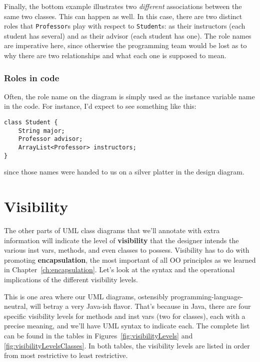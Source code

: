 Finally, the bottom example illustrates two \textit{different} associations
between the same two classes. This can happen as well. In this case, there are
two distinct roles that \texttt{Professor}s play with respect to
\texttt{Student}s: as their instructors (each student has several) and as
their advisor (each student has one). The role names are imperative here,
since otherwise the programming team would be lost as to why there are two
relationships and what each one is supposed to mean.

\subsubsection{Roles in code}

Often, the role name on the diagram is simply used as the instance variable
name in the code. For instance, I'd expect to see something like this:

\begin{Verbatim}[fontsize=\small,samepage=true,frame=single]
class Student {
    String major;    
    Professor advisor;
    ArrayList<Professor> instructors;
}
\end{Verbatim}

since those names were handed to us on a silver platter in the design diagram.

\section{Visibility}

The other parts of UML class diagrams that we'll annotate with extra
information will indicate the level of \textbf{visibility} that the designer
intends the various inst vars, methods, and even classes to possess.
Visibility has to do with promoting \textbf{encapsulation}, the most important
of all OO principles as we learned in Chapter~\ref{ch:encapsulation}. Let's
look at the syntax and the operational implications of the different
visibility levels.

This is one area where our UML diagrams, ostensibly
programming-language-neutral, will betray a very Java-ish flavor. That's
because in Java, there are four specific visibility levels for methods and
inst vars (two for classes), each with a precise meaning, and we'll have UML
syntax to indicate each. The complete list can be found in the tables in
Figures~\ref{fig:visibilityLevels} and \ref{fig:visibilityLevelsClasses}. In
both tables, the visibility levels are listed in order from most restrictive
to least restrictive.

